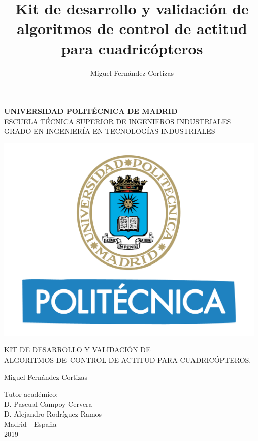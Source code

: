 \documentclass[a4paper,twoside,12pt]{report}
\title{\textbf{Kit de desarrollo y validación de algoritmos de control de actitud para cuadricópteros}}
\author{Miguel Fernández Cortizas}
\date{}
\begin{document}
	


	\begin{landscape}
	
	\end{landscape}


\pagestyle{empty}

\begin{center}
	\textbf{ UNIVERSIDAD POLITÉCNICA DE MADRID }\\
	ESCUELA TÉCNICA SUPERIOR DE INGENIEROS INDUSTRIALES\\
	GRADO EN INGENIERÍA EN TECNOLOGÍAS INDUSTRIALES
	
	
	\vspace{1cm}
	
	\includegraphics[height = 10cm]{logoupm}
	
	\vspace{1cm}
	
	{\LARGE KIT DE DESARROLLO Y VALIDACIÓN DE} 
	\\
	
	\vspace{0.2cm}
	{\LARGE	ALGORITMOS DE\ CONTROL DE ACTITUD}
		 \vspace{0.2cm}
		 {\LARGE PARA CUADRICÓPTEROS.}
	
	\vspace{2cm}
	
	
	
	{\Large Miguel Fernández Cortizas}\\
	
	
	
	
	\vspace{2cm}
	
	Tutor académico:\\
	
	{\Large D. Pascual Campoy Cervera }\\
	{\Large D. Alejandro Rodríguez Ramos }\\
	
	
	\vfill{\Large Madrid - Espa\~{n}a\\
		2019}
	
\end{center}
\end{document}
